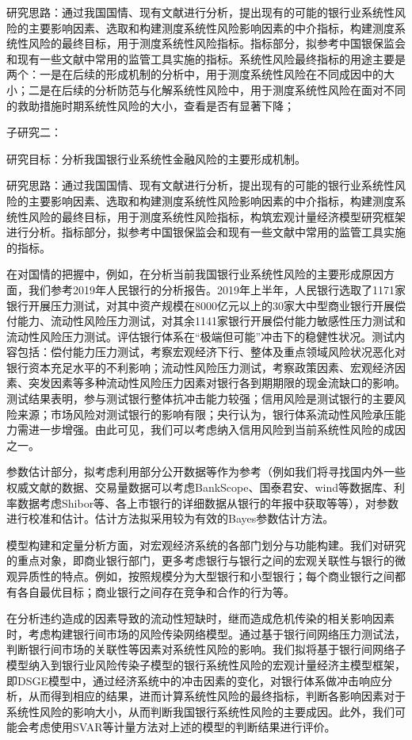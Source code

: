 研究思路：通过我国国情、现有文献进行分析，提出现有的可能的银行业系统性风险的主要影响因素、选取和构建测度系统性风险影响因素的中介指标，构建测度系统性风险的最终目标，用于测度系统性风险指标。指标部分，拟参考中国银保监会和现有一些文献中常用的监管工具实施的指标。系统性风险最终指标的用途主要是两个：一是在后续的形成机制的分析中，用于测度系统性风险在不同成因中的大小；二是在后续的分析防范与化解系统性风险中，用于测度系统性风险在面对不同的救助措施时期系统性风险的大小，查看是否有显著下降；

子研究二：

研究目标：分析我国银行业系统性金融风险的主要形成机制。

研究思路：通过我国国情、现有文献进行分析，提出现有的可能的银行业系统性风险的主要影响因素、选取和构建测度系统性风险影响因素的中介指标，构建测度系统性风险的最终目标，用于测度系统性风险指标，构筑宏观计量经济模型研究框架进行分析。指标部分，拟参考中国银保监会和现有一些文献中常用的监管工具实施的指标。

在对国情的把握中，例如，在分析当前我国银行业系统性风险的主要形成原因方面，我们参考2019年人民银行的分析报告。2019年上半年，人民银行选取了1171家银行开展压力测试，对其中资产规模在8000亿元以上的30家大中型商业银行开展偿付能力、流动性风险压力测试，对其余1141家银行开展偿付能力敏感性压力测试和流动性风险压力测试。评估银行体系在“极端但可能”冲击下的稳健性状况。测试内容包括：偿付能力压力测试，考察宏观经济下行、整体及重点领域风险状况恶化对银行资本充足水平的不利影响；流动性风险压力测试，考察政策因素、宏观经济因素、突发因素等多种流动性风险压力因素对银行各到期期限的现金流缺口的影响。测试结果表明，参与测试银行整体抗冲击能力较强；信用风险是测试银行的主要风险来源；市场风险对测试银行的影响有限；央行认为，银行体系流动性风险承压能力需进一步增强。由此可见，我们可以考虑纳入信用风险到当前系统性风险的成因之一。

参数估计部分，拟考虑利用部分公开数据等作为参考（例如我们将寻找国内外一些权威文献的数据、交易量数据可以考虑BankScope、国泰君安、wind等数据库、利率数据考虑Shibor等、各上市银行的详细数据从银行的年报中获取等等），对参数进行校准和估计。估计方法拟采用较为有效的Bayes参数估计方法。

模型构建和定量分析方面，对宏观经济系统的各部门划分与功能构建。我们对研究的重点对象，即商业银行部门，更多考虑银行与银行之间的宏观关联性与银行的微观异质性的特点。例如，按照规模分为大型银行和小型银行；每个商业银行之间都有各自最优目标；商业银行之间存在竞争和合作的行为等。

在分析违约造成的因素导致的流动性短缺时，继而造成危机传染的相关影响因素时，考虑构建银行间市场的风险传染网络模型。通过基于银行间网络压力测试法，判断银行间市场的关联性等因素对系统性风险的影响。我们拟将基于银行间网络子模型纳入到银行业风险传染子模型的银行系统性风险的宏观计量经济主模型框架，即DSGE模型中，通过经济系统中的冲击因素的变化，对银行体系做冲击响应分析，从而得到相应的结果，进而计算系统性风险的最终指标，判断各影响因素对于系统性风险的影响大小，从而判断我国银行系统性风险的主要成因。此外，我们可能会考虑使用SVAR等计量方法对上述的模型的判断结果进行评价。

